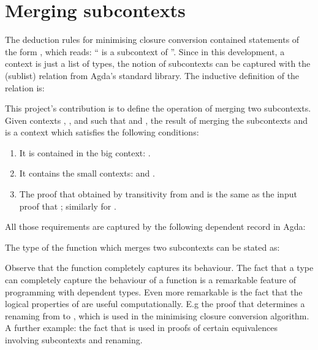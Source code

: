 \documentclass[bsc,frontabs,oneside,singlespacing,parskip,deptreport]{infthesis}
\theoremstyle{definition}
\theoremstyle{lemma}
\begin{document}
\section{Merging subcontexts}
\label{sec:merging-subcontexts}

The deduction rules for minimising closure conversion contained
statements of the form , which reads: `` is a
subcontext of ''. Since in this development, a context is just a
list of types, the notion of subcontexts can be captured with the
 (sublist) relation from Agda's standard library. The
inductive definition of the relation is:


This project's contribution is to define the operation of merging two
subcontexts. Given contexts , , and  such that
 and , the result of merging the subcontexts
 and  is a context  which satisfies the following
conditions:

\begin{enumerate}
\item It is contained in the big context: .
\item It contains the small contexts:  and .
\item The proof that  obtained by transitivity from  and  is the same as the input proof that ; similarly for .
\end{enumerate}

All those requirements are captured by the following dependent record
in Agda:


The type of the function which merges two subcontexts can be stated
as:


Observe that the function completely captures its behaviour. The fact
that a type can completely capture the behaviour of a function is a
remarkable feature of programming with dependent types. Even more
remarkable is the fact that the logical properties of  are
useful computationally. E.g the proof that  determines a
renaming from  to , which is used in the minimising
closure conversion algorithm. A further example: the fact that
 is used in proofs of certain equivalences
involving subcontexts and renaming.
\end{document}
